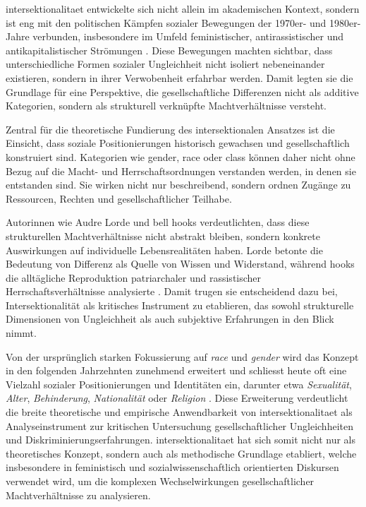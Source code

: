 \gls{intersektionalitaet} entwickelte sich nicht allein im akademischen Kontext, sondern ist eng mit den politischen Kämpfen sozialer Bewegungen der 1970er- und 1980er-Jahre verbunden, insbesondere im Umfeld feministischer, antirassistischer und antikapitalistischer Strömungen \parencite{collinsBlackFeministThought2002}. Diese Bewegungen machten sichtbar, dass unterschiedliche Formen sozialer Ungleichheit nicht isoliert nebeneinander existieren, sondern in ihrer Verwobenheit erfahrbar werden. Damit legten sie die Grundlage für eine Perspektive, die gesellschaftliche Differenzen nicht als additive Kategorien, sondern als strukturell verknüpfte Machtverhältnisse versteht.

Zentral für die theoretische Fundierung des intersektionalen Ansatzes ist die Einsicht, dass soziale Positionierungen historisch gewachsen und gesellschaftlich konstruiert sind. Kategorien wie \gls{gender}, \gls{race} oder \gls{class} können daher nicht ohne Bezug auf die Macht- und Herrschaftsordnungen verstanden werden, in denen sie entstanden sind. Sie wirken nicht nur beschreibend, sondern ordnen Zugänge zu Ressourcen, Rechten und gesellschaftlicher Teilhabe.

Autorinnen wie Audre Lorde und bell hooks verdeutlichten, dass diese strukturellen Machtverhältnisse nicht abstrakt bleiben, sondern konkrete Auswirkungen auf individuelle Lebensrealitäten haben. Lorde betonte die Bedeutung von Differenz als Quelle von Wissen und Widerstand, während hooks die alltägliche Reproduktion patriarchaler und rassistischer Herrschaftsverhältnisse analysierte \parencite{collinsBlackFeministThought2002, hancockWhenMultiplicationDoesnt2007}. Damit trugen sie entscheidend dazu bei, Intersektionalität als kritisches Instrument zu etablieren, das sowohl strukturelle Dimensionen von Ungleichheit als auch subjektive Erfahrungen in den Blick nimmt.

Von der ursprünglich starken Fokussierung auf \textit{race} und \textit{gender} wird das Konzept in den folgenden Jahrzehnten zunehmend erweitert und schliesst heute oft eine Vielzahl sozialer Positionierungen und Identitäten ein, darunter etwa \emph{Sexualität}, \emph{Alter}, \emph{Behinderung}, \emph{Nationalität} oder \emph{Religion} \parencite{bauerIntersectionalityQuantitativeResearch2021, bowlegInvitedReflectionQuantifying2016}. Diese Erweiterung verdeutlicht die breite theoretische und empirische Anwendbarkeit von \gls{intersektionalitaet} als Analyseinstrument zur kritischen Untersuchung gesellschaftlicher Ungleichheiten und Diskriminierungserfahrungen. \gls{intersektionalitaet} hat sich somit nicht nur als theoretisches Konzept, sondern auch als methodische Grundlage etabliert, welche insbesondere in feministisch und sozialwissenschaftlich orientierten Diskursen verwendet wird, um die komplexen Wechselwirkungen gesellschaftlicher Machtverhältnisse zu analysieren.


